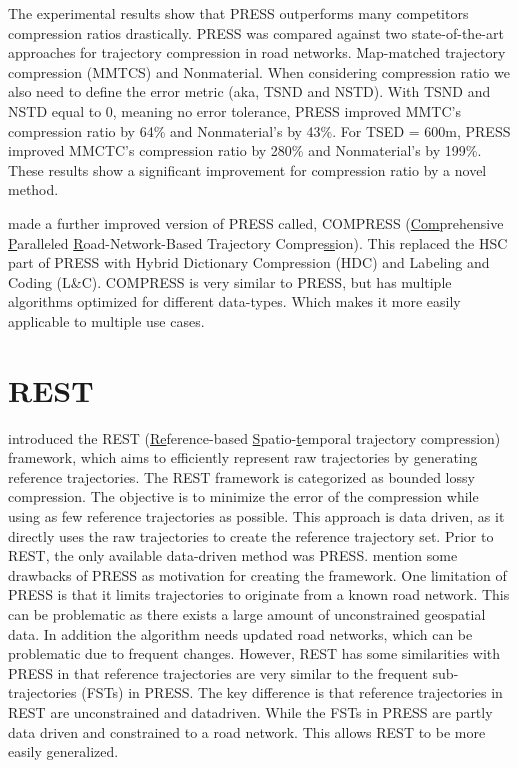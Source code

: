 The experimental results show that PRESS outperforms many competitors compression ratios drastically. PRESS was compared against two state-of-the-art approaches for trajectory compression in road networks. Map-matched trajectory compression (MMTCS) and Nonmaterial. When considering compression ratio we also need to define the error metric (aka, TSND and NSTD). With TSND and NSTD equal to 0, meaning no error tolerance, PRESS improved MMTC's compression ratio by 64\% and Nonmaterial's by 43\%. For TSED = 600m, PRESS improved MMCTC's compression ratio by 280\% and Nonmaterial's by 199\%. These results show a significant improvement for compression ratio by a novel method.

\cite{han2017compress} made a further improved version of PRESS called, COMPRESS (\underline{Com}prehensive \underline{P}aralleled \underline{R}oad-Network-Based Trajectory Compre\underline{ss}ion). This replaced the HSC part of PRESS with Hybrid Dictionary Compression (HDC) and Labeling and Coding (L\&C). COMPRESS is very similar to PRESS, but has multiple algorithms optimized for different data-types. Which makes it more easily applicable to multiple use cases.



\section{REST}
\label{sec:REST}
\cite{zhao2018rest} introduced the REST (\underline{Re}ference-based \underline{S}patio-\underline{t}emporal trajectory compression) framework, which aims to efficiently represent raw trajectories by generating reference trajectories. The REST framework is categorized as bounded lossy compression. The objective is to minimize the error of the compression while using as few reference trajectories as possible. This approach is data driven, as it directly uses the raw trajectories to create the reference trajectory set.  Prior to REST, the only available data-driven method was PRESS. \cite{zhao2018rest} mention some drawbacks of PRESS as motivation for creating the framework. One limitation of PRESS is that it limits trajectories to originate from a known road network. This can be problematic as there exists a large amount of unconstrained geospatial data. In addition the algorithm needs updated road networks, which can be problematic due to frequent changes. However, REST has some similarities with PRESS in that reference trajectories are very similar to the frequent sub-trajectories (FSTs) in PRESS. The key difference is that reference trajectories in REST are unconstrained and datadriven. While the FSTs in PRESS are partly data driven and constrained to a road network. This allows REST to be more easily generalized.

